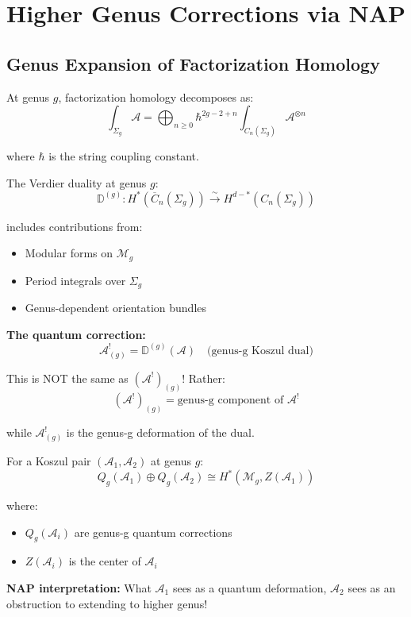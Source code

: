 \section{Higher Genus Corrections via NAP}

\subsection{Genus Expansion of Factorization Homology}

\begin{framework}\label{framework:genus-NAP}
At genus $g$, factorization homology decomposes as:
$$\int_{\Sigma_g} \mathcal{A} = \bigoplus_{n \geq 0} \hbar^{2g-2+n} \int_{C_n(\Sigma_g)} \mathcal{A}^{\otimes n}$$

where $\hbar$ is the string coupling constant.

The Verdier duality at genus $g$:
$$\mathbb{D}^{(g)}: H^*(\overline{C}_n(\Sigma_g)) \xrightarrow{\sim} H^{d-*}(C_n(\Sigma_g))$$

includes contributions from:
\begin{itemize}
\item Modular forms on $\mathcal{M}_g$
\item Period integrals over $\Sigma_g$
\item Genus-dependent orientation bundles
\end{itemize}

\textbf{The quantum correction:}
$$\mathcal{A}^!_{(g)} = \mathbb{D}^{(g)}(\mathcal{A}) \quad \text{(genus-g Koszul dual)}$$

This is NOT the same as $(\mathcal{A}^!)_{(g)}$! Rather:
$$(\mathcal{A}^!)_{(g)} = \text{genus-g component of } \mathcal{A}^!$$

while $\mathcal{A}^!_{(g)}$ is the genus-g deformation of the dual.
\end{framework}

\begin{theorem}\label{thm:genus-complementarity}
For a Koszul pair $(\mathcal{A}_1, \mathcal{A}_2)$ at genus $g$:
$$Q_g(\mathcal{A}_1) \oplus Q_g(\mathcal{A}_2) \cong H^*(\mathcal{M}_g, Z(\mathcal{A}_1))$$

where:
\begin{itemize}
\item $Q_g(\mathcal{A}_i)$ are genus-g quantum corrections
\item $Z(\mathcal{A}_i)$ is the center of $\mathcal{A}_i$
\end{itemize}

\textbf{NAP interpretation:} What $\mathcal{A}_1$ sees as a quantum deformation, $\mathcal{A}_2$ sees as an obstruction to extending to higher genus!
\end{theorem}

